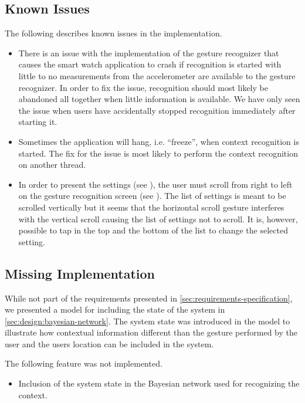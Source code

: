 \subsection{Known Issues}

The following describes known issues in the implementation.

\begin{itemize}
\item There is an issue with the implementation of the gesture recognizer that causes the smart watch application to crash if recognition is started with little to no measurements from the accelerometer are available to the gesture recognizer. In order to fix the issue, recognition should most likely be abandoned all together when little information is available. We have only seen the issue when users have accidentally stopped recognition immediately after starting it.
\item Sometimes the application will hang, i.e. ``freeze'', when context recognition is started. The fix for the issue is most likely to perform the context recognition on another thread.
\item In order to present the settings (see ), the user must scroll from right to left on the gesture recognition screen (see ). The list of settings is meant to be scrolled vertically but it seems that the horizontal scroll gesture interferes with the vertical scroll causing the list of settings not to scroll. It is, however, possible to tap in the top and the bottom of the list to change the selected setting.
\end{itemize}

\subsection{Missing Implementation}

While not part of the requirements presented in \cref{sec:requirements-specification}, we presented a model for including the state of the system in \cref{sec:design:bayesian-network}. The system state was introduced in the model to illustrate how contextual information different than the gesture performed by the user and the users location can be included in the system.

The following feature was not implemented.

\begin{itemize}
\item Inclusion of the system state in the Bayesian network used for recognizing the context.
\end{itemize}

